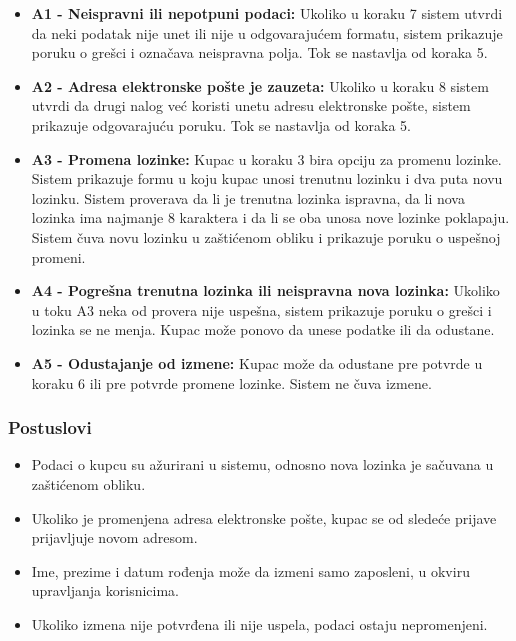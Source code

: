 \documentclass[a4paper,12pt]{article}
\begin{document}
\begin{itemize}
    \item \textbf{A1 - Neispravni ili nepotpuni podaci:}
    Ukoliko u koraku 7 sistem utvrdi da neki podatak nije unet ili nije u odgovarajućem formatu, sistem prikazuje poruku o grešci i označava neispravna polja. Tok se nastavlja od koraka 5.

    \item \textbf{A2 - Adresa elektronske pošte je zauzeta:}
    Ukoliko u koraku 8 sistem utvrdi da drugi nalog već koristi unetu adresu elektronske pošte, sistem prikazuje odgovarajuću poruku. Tok se nastavlja od koraka 5.

    \item \textbf{A3 - Promena lozinke:}
    Kupac u koraku 3 bira opciju za promenu lozinke. Sistem prikazuje formu u koju kupac unosi trenutnu lozinku i dva puta novu lozinku. Sistem proverava da li je trenutna lozinka ispravna, da li nova lozinka ima najmanje 8 karaktera i da li se oba unosa nove lozinke poklapaju. Sistem čuva novu lozinku u zaštićenom obliku i prikazuje poruku o uspešnoj promeni.

    \item \textbf{A4 - Pogrešna trenutna lozinka ili neispravna nova lozinka:}
    Ukoliko u toku A3 neka od provera nije uspešna, sistem prikazuje poruku o grešci i lozinka se ne menja. Kupac može ponovo da unese podatke ili da odustane.

    \item \textbf{A5 - Odustajanje od izmene:}
    Kupac može da odustane pre potvrde u koraku 6 ili pre potvrde promene lozinke. Sistem ne čuva izmene.
\end{itemize}

\subsubsection{Postuslovi}

\begin{itemize}
    \item Podaci o kupcu su ažurirani u sistemu, odnosno nova lozinka je sačuvana u zaštićenom obliku.
    \item Ukoliko je promenjena adresa elektronske pošte, kupac se od sledeće prijave prijavljuje novom adresom.
    \item Ime, prezime i datum rođenja može da izmeni samo zaposleni, u okviru upravljanja korisnicima.
    \item Ukoliko izmena nije potvrđena ili nije uspela, podaci ostaju nepromenjeni.
\end{itemize}
\end{document}
